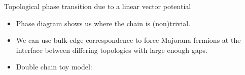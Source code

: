\documentclass[xcolor=dvipsnames,10pt,aspectratio=169]{beamer}
\renewcommand{\vec}[1]{\mathbf{#1}}
\begin{document}
  \begin{frame}{Topological phase transition due to a linear vector potential}
    \begin{multicols}{2}
      \vspace{10pt}
      \begin{itemize}
        \item Phase diagram shows us where the chain is (non)trivial. \\
        \pause
        \item We can use bulk-edge correspondence to force Majorana fermions at the interface between differing topologies with large enough gaps. \\
        \item Double chain toy model:
      \end{itemize}
      \vspace{10pt}
    \end{multicols}
  \end{frame}
\end{document}
